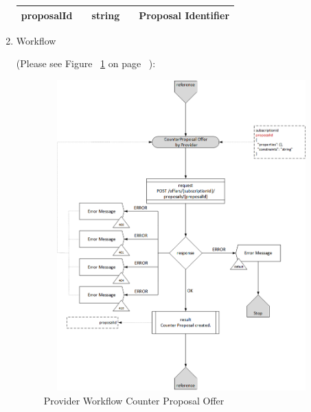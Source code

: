 \begin{enumerate}
\begin{center}
\begin{tabular}{|p{3cm}|l|p{3cm}|p{3cm}|p{4cm}|}
proposalId	&	&	string				&								& Proposal Identifier \\

\hline

\end{tabular}
\end{center}


\item Workflow

(Please see Figure ~\ref{fig:CPO} on page ~\pageref{fig:CPO}):

\begin{figure}[htbp]
    \centering
    \includegraphics[width=12cm,height=12cm,angle=0]{./diag/Workflow/Market/CounterProposalOffer-P-Workflow.png}
    \caption{Provider Workflow Counter Proposal Offer }
	\label{fig:CPO}
\end{figure}


\end{enumerate}

\newpage


